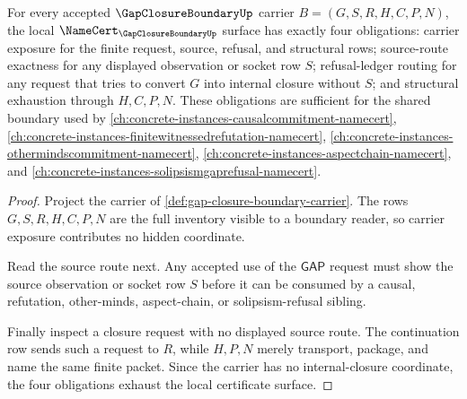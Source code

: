 \begin{theorem}
\label{thm:gap-closure-boundary-namecert-obligations}
For every accepted $\GapClosureBoundaryUp$ carrier $B=(G,S,R,H,C,P,N)$, the local $\NameCert_{\GapClosureBoundaryUp}$ surface has exactly four obligations: carrier exposure for the finite request, source, refusal, and structural rows; source-route exactness for any displayed observation or socket row $S$; refusal-ledger routing for any request that tries to convert $G$ into internal closure without $S$; and structural exhaustion through $H,C,P,N$. These obligations are sufficient for the shared boundary used by \autoref{ch:concrete-instances-causalcommitment-namecert}, \autoref{ch:concrete-instances-finitewitnessedrefutation-namecert}, \autoref{ch:concrete-instances-othermindscommitment-namecert}, \autoref{ch:concrete-instances-aspectchain-namecert}, and \autoref{ch:concrete-instances-solipsismgaprefusal-namecert}.
\end{theorem}
\begin{proof}
Project the carrier of \autoref{def:gap-closure-boundary-carrier}. The rows $G,S,R,H,C,P,N$ are the full inventory visible to a boundary reader, so carrier exposure contributes no hidden coordinate.

Read the source route next. Any accepted use of the $\mathsf{GAP}$ request must show the source observation or socket row $S$ before it can be consumed by a causal, refutation, other-minds, aspect-chain, or solipsism-refusal sibling.

Finally inspect a closure request with no displayed source route. The continuation row sends such a request to $R$, while $H,P,N$ merely transport, package, and name the same finite packet. Since the carrier has no internal-closure coordinate, the four obligations exhaust the local certificate surface.
\end{proof}

